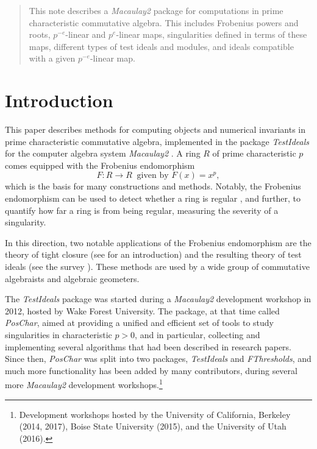 \documentclass{amsart}
\begin{document}
\begin{abstract}
	This note describes a \emph{Macaulay2} package for computations in prime characteristic commutative algebra.  This includes Frobenius powers and roots, $p^{-e}$-linear and $p^{e}$-linear  maps,
  singularities defined in terms of these maps, different types of test ideals and modules, and ideals compatible with a given $p^{-e}$-linear map.
\end{abstract}




\maketitle

\section{Introduction}

This paper describes methods for computing objects and numerical invariants in prime characteristic commutative algebra, implemented in the package \emph{TestIdeals} for the computer algebra system \emph{Macaulay2} \cite{M2}.
A ring $R$ of prime characteristic $p$ comes equipped with the Frobenius endomorphism
\[ F: R \to R \ \text{ given by } F(x) =  x^p,\]
which is the basis for many constructions and methods.
Notably, the Frobenius endomorphism can be used to detect whether a ring is regular \cite{KunzCharacterizationsOfRegularLocalRings}, and further, to quantify how far a ring is from being regular, measuring the severity of a singularity.

In this direction, two notable applications of the Frobenius endomorphism are the theory of tight closure
(see \cite{HochsterHunekeTC1,HochsterFoundations} for an introduction)
and the resulting theory of test ideals
(see the survey \cite{SchwedeTuckerTestIdealSurvey}).  These methods are used by a wide group of commutative algebraists and algebraic geometers.

The \emph{TestIdeals} package was started during a \emph{Macaulay2} development workshop in 2012, hosted by Wake Forest University.
The package, at that time called \emph{PosChar}, aimed at providing a unified and efficient set of tools to study singularities in characteristic $p > 0$, and in particular, collecting and implementing several algorithms that had been described in research papers.
Since then, \emph{PosChar} was split into two packages, \emph{TestIdeals} and \emph{FThresholds}, and
much more functionality has been added by many contributors, during several more \emph{Macaulay2} development workshops.\footnote{Development workshops hosted by the University of California, Berkeley (2014, 2017), Boise State University (2015), and the University of Utah (2016).}
\end{document}
